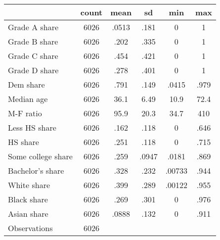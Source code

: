 {
\def\sym#1{\ifmmode^{#1}\else\(^{#1}\)\fi}
\begin{tabular}{l*{1}{ccccc}}
\toprule
                    &       count&        mean&          sd&         min&         max\\
\midrule
Grade A share       &        6026&       .0513&        .181&           0&           1\\
Grade B share       &        6026&        .202&        .335&           0&           1\\
Grade C share       &        6026&        .454&        .421&           0&           1\\
Grade D share       &        6026&        .278&        .401&           0&           1\\
Dem share           &        6026&        .791&        .149&       .0415&        .979\\
Median age          &        6026&        36.1&        6.49&        10.9&        72.4\\
M-F ratio           &        6026&        95.9&        20.3&        34.7&         410\\
Less HS share       &        6026&        .162&        .118&           0&        .646\\
HS share            &        6026&        .251&        .118&           0&        .715\\
Some college share  &        6026&        .259&       .0947&       .0181&        .869\\
Bachelor's share    &        6026&        .328&        .232&      .00733&        .944\\
White share         &        6026&        .399&        .289&      .00122&        .955\\
Black share         &        6026&        .269&        .301&           0&        .976\\
Asian share         &        6026&       .0888&        .132&           0&        .911\\
\midrule
Observations        &        6026&            &            &            &            \\
\bottomrule
\end{tabular}
}
